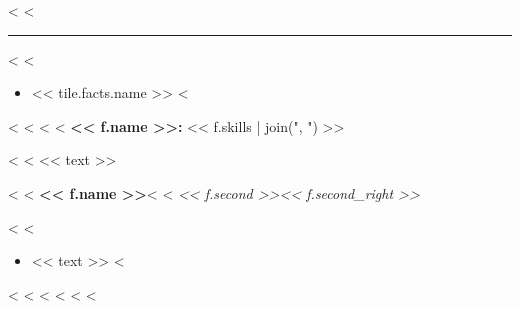 \documentclass[letterpaper,10pt]{article}
\newcommand{\resumesection}[1]{\vspace{5pt}{\large\bfseries #1}\par\vspace{-3pt}\rule{\linewidth}{0.4pt}\par\vspace{2pt}}
\begin{document}
<%
<%
\resumesection{<< section.heading >>}
<%
<%
\begin{itemize}
<%
\item << tile.facts.name >>
<%
\end{itemize}
<%
<%
<%
<%
\textbf{<< f.name >>:} << f.skills | join(", ") >>\par
<%
<%
<< text >>\par
<%
<%
\textbf{<< f.name >>}<%
<%
\textit{<< f.second >>}\hfill \textit{<< f.second_right >>}\par
<%
<%
\begin{itemize}
<%
\item << text >>
<%
\end{itemize}
<%
\vspace{2pt}
<%
<%
<%
<%
<%
\end{document}
